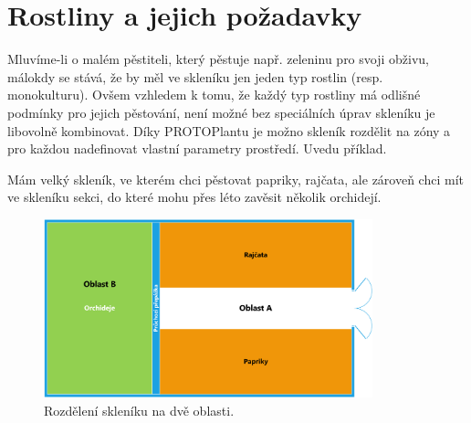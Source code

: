 \chapter{Rostliny a jejich požadavky}
Mluvíme-li o malém pěstiteli, který pěstuje např. zeleninu pro svoji obživu, málokdy se stává, že by měl ve skleníku jen jeden typ rostlin (resp. monokulturu).
Ovšem vzhledem k tomu, že každý typ rostliny má odlišné podmínky pro jejich pěstování, není možné bez speciálních úprav skleníku je libovolně kombinovat.
Díky PROTOPlantu je možno skleník rozdělit na zóny a pro každou nadefinovat vlastní parametry prostředí.
Uvedu příklad.

Mám velký skleník, ve kterém chci pěstovat papriky, rajčata, ale zároveň chci mít ve skleníku sekci, do které mohu přes léto zavěsit několik orchidejí.
\begin{figure}[htbp]
    \centering
    \includegraphics[width=0.85\textwidth]{img/Rozdeleni_Skleniku_A.png}
    \caption{Rozdělení skleníku na dvě oblasti.}
    \label{fig:separationA}
\end{figure}

\newpage